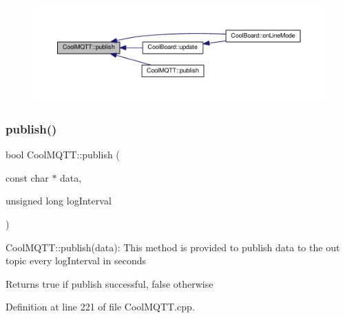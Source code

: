 \begin{figure}[H]
\begin{center}
\leavevmode
\includegraphics[width=350pt]{d0/dd0/class_cool_m_q_t_t_ace977b3e90ab14b1199fe5c4fb0a13ec_icgraph}
\end{center}
\end{figure}
\mbox{\label{class_cool_m_q_t_t_a613c5e3927ae85bb94fbf648d84d8780}} 
\subsubsection{\texorpdfstring{publish()}{publish()}\hspace{0.1cm}{\footnotesize\ttfamily [2/2]}}
{\footnotesize\ttfamily bool Cool\+M\+Q\+T\+T\+::publish (\begin{DoxyParamCaption}\item[{const char $\ast$}]{data,  }\item[{unsigned long}]{log\+Interval }\end{DoxyParamCaption})}

Cool\+M\+Q\+T\+T\+::publish(data)\+: This method is provided to publish data to the out topic every log\+Interval in seconds

\begin{DoxyReturn}{Returns}
true if publish successful, false otherwise 
\end{DoxyReturn}


Definition at line 221 of file Cool\+M\+Q\+T\+T.\+cpp.


